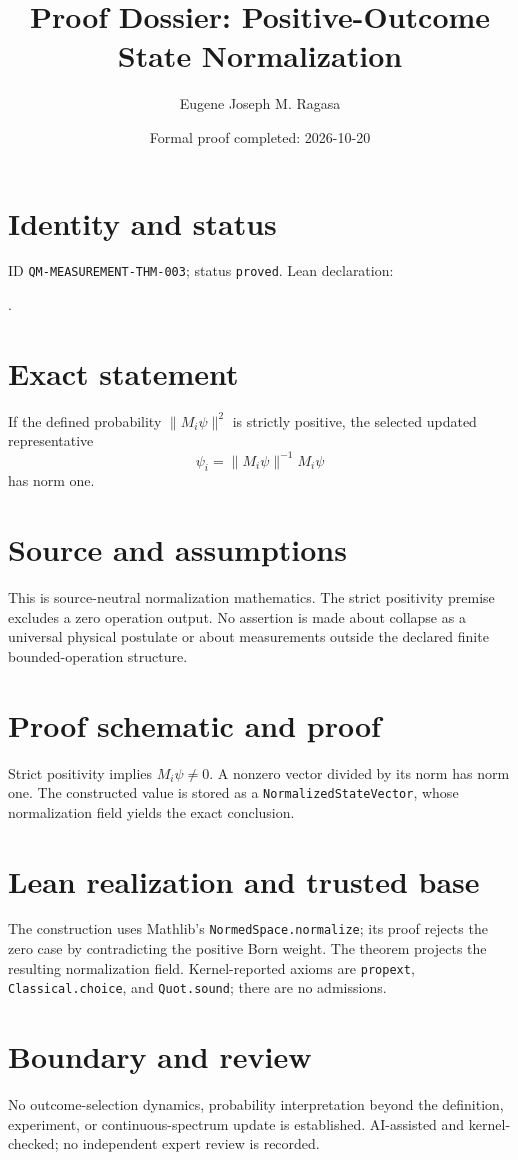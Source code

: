 \documentclass[11pt]{article}
\title{Proof Dossier: Positive-Outcome State Normalization}\author{Eugene Joseph M. Ragasa}\date{Formal proof completed: 2026-10-20}
\begin{document}
\maketitle
\section{Identity and status}
ID \texttt{QM-MEASUREMENT-THM-003}; status \texttt{proved}. Lean declaration:
\par{}.
\section{Exact statement}
If the defined probability $\lVert M_i\psi\rVert^2$ is strictly positive, the selected updated
representative
\[\psi_i=\lVert M_i\psi\rVert^{-1}M_i\psi\]
has norm one.
\section{Source and assumptions}
This is source-neutral normalization mathematics. The strict positivity premise excludes a zero
operation output. No assertion is made about collapse as a universal physical postulate or about
measurements outside the declared finite bounded-operation structure.
\section{Proof schematic and proof}
Strict positivity implies $M_i\psi\ne0$. A nonzero vector divided by its norm has norm one. The
constructed value is stored as a \texttt{NormalizedStateVector}, whose normalization field yields
the exact conclusion.
\section{Lean realization and trusted base}
The construction uses Mathlib's \texttt{NormedSpace.normalize}; its proof rejects the zero case by
contradicting the positive Born weight. The theorem projects the resulting normalization field.
Kernel-reported axioms are \texttt{propext}, \texttt{Classical.choice}, and \texttt{Quot.sound};
there are no admissions.
\section{Boundary and review}
No outcome-selection dynamics, probability interpretation beyond the definition, experiment, or
continuous-spectrum update is established. AI-assisted and kernel-checked; no independent expert
review is recorded.
\end{document}
